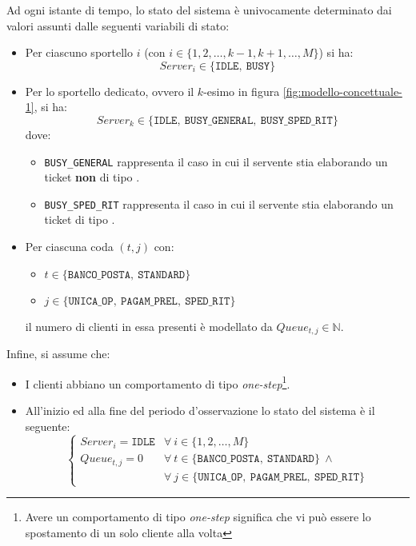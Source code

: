 Ad ogni istante di tempo, lo stato del sistema è univocamente determinato dai valori assunti dalle seguenti variabili di stato:
\begin{itemize}
\item Per ciascuno sportello $i$ (con $i \in \lbrace 1, 2, \dots, k-1, k+1, \dots, M \rbrace$) si ha:
\begin{equation}
Server_i \in \lbrace \mathtt{IDLE},\ \mathtt{BUSY} \rbrace 
\end{equation}
\item Per lo sportello dedicato, ovvero il $k$-esimo in figura \ref{fig:modello-concettuale-1}, si ha:
\begin{equation}
Server_k \in \lbrace \mathtt{IDLE},\ \mathtt{BUSY\_GENERAL},\ \mathtt{BUSY\_SPED\_RIT}\rbrace 
\end{equation}
dove:
\begin{itemize}
\item \texttt{BUSY\_GENERAL} rappresenta il caso in cui il servente stia elaborando un ticket \textbf{non} di tipo \sr{}.
\item \texttt{BUSY\_SPED\_RIT} rappresenta il caso in cui il servente stia elaborando un ticket di tipo \sr{}.
\end{itemize}
\item Per ciascuna coda $(t, j)$ con:
\begin{itemize}
\item $t \in \lbrace \mathtt{BANCO\_POSTA},\ \mathtt{STANDARD}\rbrace$
\item $j \in \lbrace \mathtt{UNICA\_OP},\ \mathtt{PAGAM\_PREL},\ \mathtt{SPED\_RIT} \rbrace$
\end{itemize}
il numero di clienti in essa presenti è modellato da $Queue_{t,j} \in \mathbb{N}$.
\end{itemize}

Infine, si assume che:
\begin{itemize}
\item I clienti abbiano un comportamento di tipo \textsl{one-step}\footnote{Avere un comportamento di tipo \textsl{one-step} significa che vi può essere lo spostamento di un solo cliente alla volta}.
\item All'inizio ed alla fine del periodo d'osservazione lo stato del sistema è il seguente:
\begin{equation}
\begin{cases}
Server_i =\mathtt{IDLE} & \forall\ i \in \lbrace 1, 2, \dots, M \rbrace \\[1em]
Queue_{t,j} = 0 & \forall\ t \in \lbrace \mathtt{BANCO\_POSTA},\ \mathtt{STANDARD}\rbrace\ \wedge \\
& \forall\ j \in \lbrace \mathtt{UNICA\_OP},\ \mathtt{PAGAM\_PREL},\ \mathtt{SPED\_RIT} \rbrace
\end{cases}
\end{equation}
\end{itemize}


